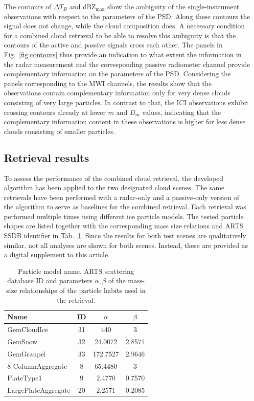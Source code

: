 \documentclass[journal abbreviation, manuscript]{copernicus}
\begin{document}
The contours of $\Delta T_B$ and $\text{dBZ}_\text{max}$  show the ambiguity
of the single-instrument observations with respect to the parameters of the PSD:
Along these contours the signal does not change, while the cloud composition
does. A necessary condition for a combined cloud retrieval to be able to resolve
this ambiguity is that the contours of the active and passive signals cross each
other. The panels in Fig.~\ref{fig:contours} thus provide an indication to what
extent the information in the radar measurement and the corresponding passive
radiometer channel provide complementary information on the parameters of the
PSD. Considering the panels corresponding to the MWI channels, the results show
that the observations contain complementary information only for very dense
clouds consisting of very large particles. In contrast to that, the ICI
observations exhibit crossing contours already at lower $m$ and $D_m$ values,
indicating that the complementary information content in these observations is
higher for less dense clouds consisting of smaller particles.

\subsection{Retrieval results}

To assess the performance of the combined cloud retrieval, the developed
algorithm has been applied to the two designated cloud scenes. The same
retrievals have been performed with a radar-only and a passive-only version of
the algorithm to serve as baselines for the combined retrieval. Each retrieval
was performed multiple times using different ice particle models. The tested
particle shapes are listed together with the corresponding mass size relations
and ARTS SSDB identifier in Tab.~\ref{tab:particles_retrieval}. Since the
results for both test scenes are qualitatively similar, not all analyses are
shown for both scenes. Instead, these are provided as a digital supplement to
this article.

\begin{table}
  \centering
  \caption{Particle model name, ARTS scattering database ID and parameters
    $\alpha, \beta$ of the mass-size relationships of the particle habits used
    in the retrieval.}
  \begin{tabular}{l|c|c|c}
    Name & ID & $\alpha$ & $\beta$ \\
    \hline
    GemCloudIce         & 31  & 440      & 3 \\
    GemSnow             & 32  & 24.0072  & 2.8571 \\
    GemGraupel          & 33  & 172.7527 & 2.9646 \\
    8-ColumnAggregate   &  8  & 65.4480  & 3      \\
    PlateType1          &  9  & 2.4770   & 0.7570 \\
    LargePlateAggregate &  20 & 2.2571   & 0.2085 \\
  \end{tabular}
  \label{tab:particles_retrieval}
\end{table}
\end{document}
